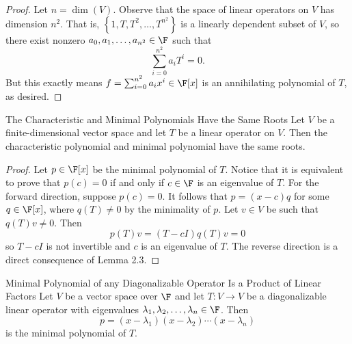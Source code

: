 \documentclass[math_245.tex]{subfiles}
\begin{document}
    \begin{proof}
        Let $n = \dim(V)$. Observe that the space of linear operators on $V$ has dimension $n^2$. That is, $\left\lbrace 1, T, T^2, \ldots, T^{n^2} \right\rbrace$ is a linearly dependent subset of $V$, so there exist nonzero $a_0, a_1, \ldots, a_{n^2}\in \F$ such that
        \begin{equation*}
            \sum^{n^2}_{i=0} a_iT^i = 0.
        \end{equation*}
        But this exactly means $f = \sum^{n^2}_{i=0} a_ix^i\in\F[x]$ is an annihilating polynomial of $T$, as desired.
    \end{proof}

    \begin{lemma}{The Characteristic and Minimal Polynomials Have the Same Roots}
        Let $V$ be a finite-dimensional vector space and let $T$ be a linear operator on $V$. Then the characteristic polynomial and minimal polynomial have the same roots.
    \end{lemma}

    \begin{proof}
        Let $p\in\F[x]$ be the minimal polynomial of $T$. Notice that it is equivalent to prove that $p(c) = 0$ if and only if $c\in \F$ is an eigenvalue of $T$. For the forward direction, suppose $p(c) = 0$. It follows that $p = (x-c)q$ for some $q\in\F[x]$, where $q(T)\neq 0$ by the minimality of $p$. Let $v\in V$ be such that $q(T)v\neq 0$. Then
        \begin{equation*}
            p(T)v = (T-cI)q(T)v = 0
        \end{equation*}
        so $T-cI$ is not invertible and $c$ is an eigenvalue of $T$. The reverse direction is a direct consequence of Lemma 2.3.
    \end{proof}

    \clearpage
    
    \begin{prop}{Minimal Polynomial of any Diagonalizable Operator Is a Product of Linear Factors}
        Let $V$ be a vector space over $\F$ and let $T:V\to V$ be a diagonalizable linear operator with eigenvalues $\lambda_1, \lambda_2, \ldots, \lambda_n\\ \in \F$. Then
        \begin{equation*}
            p = (x-\lambda_1)(x-\lambda_2)\cdots(x-\lambda_n)
        \end{equation*}
        is the minimal polynomial of $T$.
    \end{prop}
\end{document}
